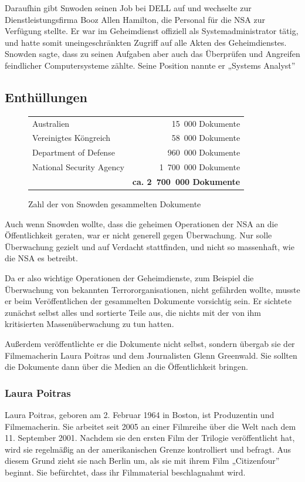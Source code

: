 \documentclass[12pt,a4paper]{scrartcl}
\begin{document}
Daraufhin gibt Snwoden seinen Job bei DELL auf und wechselte zur Dienstleistungsfirma Booz Allen Hamilton, die Personal für die NSA zur Verfügung stellte. Er war im Geheimdienst offiziell als Systemadministrator tätig, und hatte somit uneingeschränkten Zugriff auf alle Akten des Geheimdienstes. Snowden sagte, dass zu seinen Aufgaben aber auch das Überprüfen und Angreifen feindlicher Computersysteme zählte. Seine Position nannte er „Systems Analyst”

\subsection{Enthüllungen}

\begin{figure}[H]
\centering
\begin{tabular}{lr}
Australien & 15~000 Dokumente \\
Vereinigtes Köngreich & 58~000 Dokumente \\
Department of Defense & 960~000 Dokumente \\
National Security Agency & 1~700~000 Dokumente \\
& \textbf{ca. 2~700~000 Dokumente}
\end{tabular}
\caption{Zahl der von Snowden gesammelten Dokumente}
\end{figure}

Auch wenn Snowden wollte, dass die geheimen Operationen der NSA an die Öffentlichkeit geraten, war er nicht generell gegen Überwachung. Nur solle Überwachung gezielt und auf Verdacht stattfinden, und nicht so massenhaft, wie die NSA es betreibt. 

Da er also wichtige Operationen der Geheimdienste, zum Beispiel die Überwachung von bekannten Terrororganisationen, nicht gefährden wollte, musste er beim Veröffentlichen der gesammelten Dokumente vorsichtig sein. Er sichtete zunächst selbst alles und sortierte Teile aus, die nichts mit der von ihm kritisierten Massenüberwachung zu tun hatten.

Außerdem veröffentlichte er die Dokumente nicht selbst, sondern übergab sie der Filmemacherin Laura Poitras und dem Journalisten Glenn Greenwald. Sie sollten die Dokumente dann über die Medien an die Öffentlichkeit bringen.

\subsubsection{Laura Poitras}
Laura Poitras, geboren am 2. Februar 1964 in Boston, ist Produzentin und Filmemacherin. Sie arbeitet seit 2005 an einer Filmreihe über die Welt nach dem 11. September 2001. Nachdem sie den ersten Film der Trilogie veröffentlicht hat, wird sie regelmäßig an der amerikanischen Grenze kontrolliert und befragt. Aus diesem Grund zieht sie nach Berlin um, als sie mit ihrem Film „Citizenfour” beginnt. Sie befürchtet, dass ihr Filmmaterial beschlagnahmt wird.\cite{praxisfilms}
\end{document}
